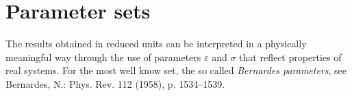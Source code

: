 \documentclass[a4paper,11pt]{scrartcl}
\begin{document}
\section*{Parameter sets}
The results obtained in reduced units can be interpreted in a physically meaningful way through the use of parameters $\varepsilon$ and $\sigma$ that reflect properties of real systems. For the most well know set, the so called \textit{Bernardes parameters}, see  Bernardes, N.: Phys. Rev. 112 (1958), p. 1534–1539.
\end{document}
